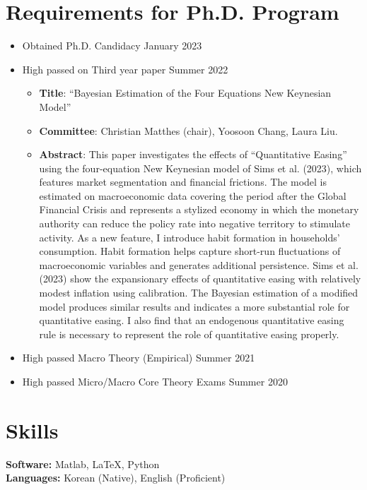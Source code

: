 \documentclass[11pt,a4paper]{article}
\begin{document}
\section*{Requirements for Ph.D. Program}
\begin{itemize}[leftmargin=*]
    \item Obtained Ph.D. Candidacy \hfill January 2023
    \item High passed on Third year paper \hfill Summer 2022
    \begin{itemize}
        \item \textbf{Title}: ``Bayesian Estimation of the Four Equations New Keynesian Model''
        \item \textbf{Committee}: Christian Matthes (chair), Yoosoon Chang, Laura Liu.
        \item \textbf{Abstract}: 
        This paper investigates the effects of “Quantitative Easing” using the four-equation New Keynesian model of Sims et al. (2023), which features market segmentation and financial frictions. The model is estimated on macroeconomic data covering the period after the Global Financial Crisis and represents a stylized economy in which the monetary authority
        can reduce the policy rate into negative territory to stimulate activity. As a new feature, I introduce habit formation in households’ consumption. Habit formation helps capture short-run fluctuations of macroeconomic variables and generates additional persistence. Sims et al. (2023) show the expansionary effects of quantitative easing with relatively modest inflation using calibration. The Bayesian estimation of a modified model produces similar results and indicates a more substantial role for quantitative easing. I also find that an endogenous quantitative easing rule is necessary to represent the role of quantitative easing properly.
    \end{itemize}
    \item High passed Macro Theory (Empirical) \hfill Summer 2021
    \item High passed Micro/Macro Core Theory Exams \hfill Summer 2020 
\end{itemize}

\vspace{5mm}
\section*{Skills}
\textbf{Software:} Matlab, LaTeX, Python \\
\textbf{Languages:} Korean (Native), English (Proficient)
\end{document}
